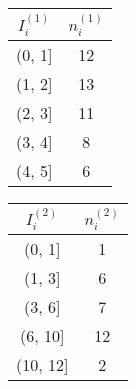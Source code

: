 \documentclass[a4paper,12pt]{article}
\begin{document}
\begin{center}
    \begin{tabular}{|c|c|}
        \hline
        $I_i^{(1)}$ & $n_i^{(1)}$ \\
        \hline
        (0, 1] & 12 \\
        (1, 2] & 13 \\
        (2, 3] & 11 \\
        (3, 4] & 8 \\
        (4, 5] & 6 \\
        \hline
    \end{tabular}
    \quad
    \begin{tabular}{|c|c|}
        \hline
        $I_i^{(2)}$ & $n_i^{(2)}$ \\
        \hline
        (0, 1] & 1 \\
        (1, 3] & 6 \\
        (3, 6] & 7 \\
        (6, 10] & 12 \\
        (10, 12] & 2 \\
        \hline
    \end{tabular}
\end{center}
\end{document}
